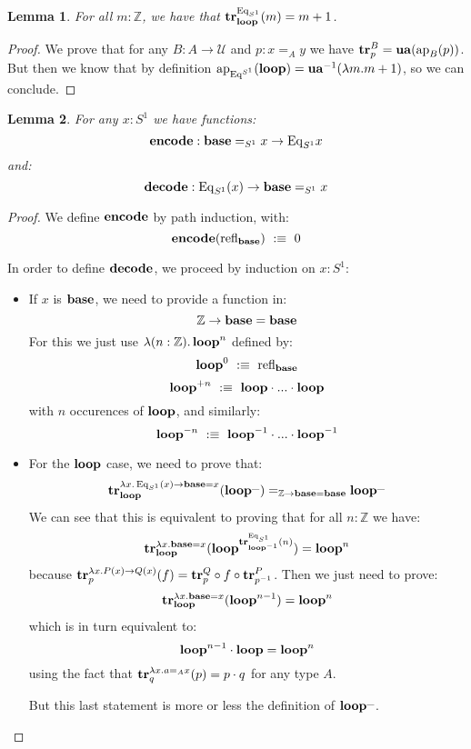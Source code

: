 \documentclass{article}
\newcommand{\encode}{\mathrm{\bf encode}}
\newcommand{\decode}{\mathrm{\bf decode}}
\newcommand{\U}{{\mathcal U}}
\renewcommand{\r}{\rightarrow}
\newcommand{\Gl}{\lambda}
\newcommand{\ap}{\mathrm{ap}}
\newcommand{\refl}{\mathrm{refl}}
\newcommand{\tr}{\mathrm{\bf tr}}
\newcommand{\ua}{\mathrm{\bf ua}}
\newcommand{\base}{\mathrm{\bf base}}
\renewcommand{\loop}{\mathrm{\bf loop}}
\newcommand{\Eq}{\mathrm{Eq}}
\newtheorem{lemma}{Lemma}
\newtheorem{definition}{Definition}
\begin{document}

\begin{lemma}
For all $m:\mathbb{Z}$, we have that $\tr_\loop^{\Eq_{S^1}}(m) = m+1$.
\end{lemma}
\begin{proof}
We prove that for any $B:A\r \U$ and $p:x=_Ay$ we have $\tr^B_p = \ua(\ap_B(p))$. But then we know that by definition $\ap_{\Eq^{S^1}}(\loop) = \ua^{-1}(\Gl m.m+1)$, so we can conclude.
\end{proof}

\begin{lemma}
For any $x:S^1$ we have functions:
\[\encode : \base=_{S^1} x \r \Eq_{S^1} x\]
and:
\[\decode : \Eq_{S^1}(x) \r \base=_{S^1} x\]
\end{lemma}
\begin{proof}
We define $\encode$ by path induction, with:
\[\encode(\refl_\base) \ :\equiv\ 0\]

In order to define $\decode$, we proceed by induction on $x:S^1$:
\begin{itemize}
\item If $x$ is $\base$, we need to provide a function in:
\[\mathbb{Z} \r \base=\base\]
For this we just use $\Gl (n:\mathbb{Z}).\, \loop^n$ defined by:
\[\loop^0 \ :\equiv \ \refl_\base\]
\[\loop^{+n} \ :\equiv\ \loop \cdot ...\cdot \loop \]
with $n$ occurences of $\loop$, and similarly:
\[\loop^{-n} \ :\equiv\  \loop^{-1} \cdot ... \cdot \loop^{-1}\]
\item For the $\loop$ case, we need to prove that:
\[\tr^{\Gl x.\, \Eq_{S^1}(x)\r \base=x}_{\loop}(\loop^{\_}) =_{\mathbb{Z} \r \base=\base} \loop^{\_} \]
We can see that this is equivalent to proving that for all $n:\mathbb{Z}$ we have:
\[ \tr^{\Gl x. \base=x}_\loop(\loop^{\tr_{\loop^{-1}}^{\Eq_{S^1}}(n)})= \loop^n\]
because $\tr^{\Gl x.P(x)\r Q(x)}_p(f) = \tr^Q_p\circ f\circ \tr^P_{p^{-1}}$. Then we just need to prove:%
\[\tr^{\Gl x.\base=x}_\loop(\loop^{n-1}) = \loop^n\]
which is in turn equivalent to:
\[\loop^{n-1}\cdot\loop = \loop^n\]
using the fact that $\tr_q^{\Gl x.a=_Ax}(p) = p\cdot q$ for any type $A$.

But this last statement is more or less the definition of $\loop^{\_}$.
\end{itemize}
\end{proof}
\end{document}
